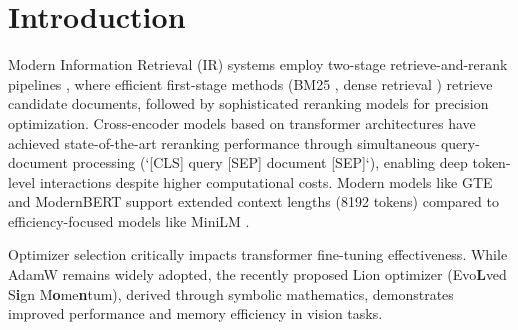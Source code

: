 \documentclass[conference]{IEEEtran}
\begin{document}
\section{Introduction}
Modern Information Retrieval (IR) systems employ two-stage retrieve-and-rerank pipelines \cite{hu2019retrievereadrerankendtoend}, where efficient first-stage methods (BM25 \cite{robertson2009probabilistic}, dense retrieval \cite{karpukhin2020dense}) retrieve candidate documents, followed by sophisticated reranking models for precision optimization. Cross-encoder models based on transformer architectures \cite{devlin2019bert} have achieved state-of-the-art reranking performance \cite{nogueira2020passagererankingbert, Nogueira2020Document} through simultaneous query-document processing (`[CLS] query [SEP] document [SEP]`), enabling deep token-level interactions despite higher computational costs. Modern models like GTE \cite{li2023towards} and ModernBERT \cite{modernbert} support extended context lengths (8192 tokens) compared to efficiency-focused models like MiniLM \cite{wang2020minilm}.

Optimizer selection critically impacts transformer fine-tuning effectiveness. While AdamW \cite{loshchilov2019decoupled} remains widely adopted, the recently proposed Lion optimizer \cite{chen2023symbolic} (Evo\textbf{L}ved S\textbf{i}gn M\textbf{o}me\textbf{n}tum), derived through symbolic mathematics, demonstrates improved performance and memory efficiency in vision tasks.
\end{document}
